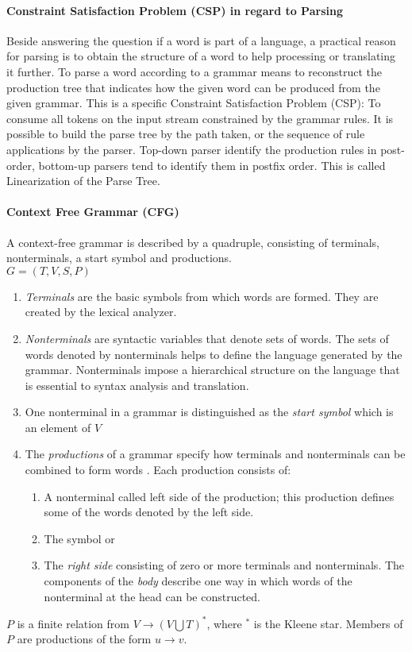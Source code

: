\paragraph{Constraint Satisfaction Problem (CSP) in regard to Parsing} 
Beside answering the question if a word is part of a language, a practical reason for parsing is to obtain the structure of a word to help processing or translating it further. To parse a word according to a grammar means to reconstruct the production tree that indicates how the given word can be produced from the given grammar. This is a specific Constraint Satisfaction Problem (CSP): To consume all tokens on the input stream constrained by the grammar rules. It is possible to build the parse tree by the path taken, or the sequence of rule applications by the parser.  Top-down parser identify the production rules in post-order, bottom-up parsers tend to identify them in postfix order. This is called Linearization of the Parse Tree. \cite{ParserBook}

\paragraph{Context Free Grammar (CFG)}
A context-free grammar is described by a quadruple, consisting of terminals, nonterminals, a start symbol and productions.\\
$G = (T, V, S, P)$
\begin{enumerate}
	\item \emph{Terminals} are the basic symbols from which words are formed.  They are created by the lexical analyzer.
	\item \emph{Nonterminals} are syntactic variables that denote sets of words. The sets of words denoted by nonterminals helps to define the language generated by the grammar. Nonterminals impose a hierarchical structure on the language that is essential to syntax analysis and translation.
	\item One nonterminal in a grammar is distinguished as the \emph{start symbol} which is an element of $V$
	\item The \emph{productions} of a grammar specify how terminals and nonterminals can be combined to form words . Each production consists of:
	\begin{enumerate}
		\item A nonterminal called left side of the production; this production defines some of the words denoted by the left side.
		\item The symbol \code{$\rightarrow$}  or  \code{::=} 
		\item The \emph{right side} consisting of zero or more terminals and nonterminals. The components of the \emph{body} describe one way in which words of the nonterminal at the head can be constructed.
	\end{enumerate}
\end{enumerate}
 $P$ is a finite relation from $V \rightarrow (V  \bigcup  T)^*$, where $^*$ is the Kleene star. Members of $P$ are productions of the form $u \rightarrow v$. \cite{DragonBook}


